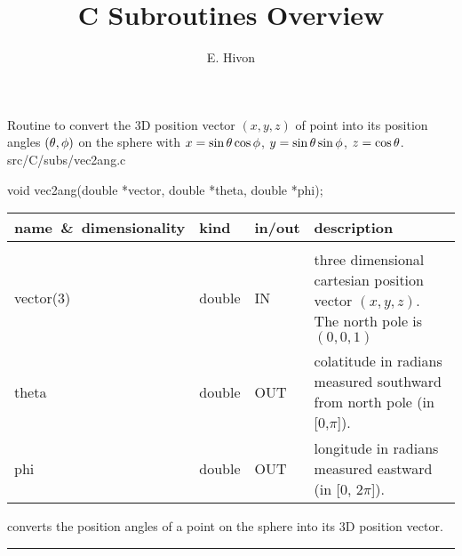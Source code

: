 

\sloppy


\title{\healpix C Subroutines Overview}
 \section[vec2ang]{ }
\label{csub:vec2ang}
\author{E. Hivon}

\begin{facility}
{Routine to convert the 3D position vector $(x,y,z)$ of point into its position
  angles  $(\theta,\phi)$ on the sphere with
$x = \sin\theta\cos\phi$, $y=\sin\theta\sin\phi$, $z=\cos\theta$.
}
{src/C/subs/vec2ang.c}
\end{facility}

\begin{Cfunction}
{void vec2ang(double *vector, double *theta, double *phi);}
\end{Cfunction}

\begin{arguments}
{
\begin{tabular}{p{0.3\hsize} p{0.10\hsize} p{0.05\hsize} p{0.45\hsize}} \hline  
\textbf{name~\&~dimensionality} & \textbf{kind} & \textbf{in/out} & \textbf{description} \\ \hline
                   &   &   &                           \\ %
vector(3) & double & IN & three dimensional cartesian position vector
                   $(x,y,z)$. The north pole is $(0,0,1)$\\
theta & double & OUT & colatitude in radians measured southward from north pole (in
    [0,$\pi$]). \\
phi   & double & OUT & longitude in radians measured eastward (in [0, $2\pi$]).\\
\end{tabular}
}
\end{arguments}

\begin{related}
  \begin{sulist}{} %
  \item[\htmlref{ang2vec}{csub:ang2vec}] converts the position angles of a point on the sphere 
into its 3D position vector.
  \end{sulist}
\end{related}

\rule{\hsize}{2mm}

